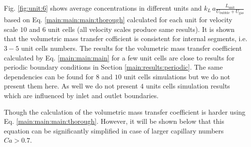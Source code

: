 \documentclass{article}
\newcommand{\feqal}{\end{aligned}\end{equation}}
\newcommand{\vol}{k_L\,a}
\newcommand{\lunit}{L_{\mathrm{unit}}}
\newcommand{\ububble}{U_{\mathrm{bubble}}}
\newcommand{\uliq}{U_{\mathrm{liq}}}
\newcommand{\ugas}{U_{\mathrm{gas}}}
\newcommand{\volnondim}{\vol \frac{\lunit}{\ububble+\ugas}}
\begin{document}
Fig. \ref{fig:unit:6} shows average concentrations in different units and $\volnondim$ based on Eq.
\ref{main:main:main:thorough} calculated for each unit for velocity
scale $10$ and  $6$ unit cells (all velocity scales produce same results). It is shown that the
volumetric mass transfer cofficient is consistent for internal segments, i.e. $3-5$ unit cells numbers.  The results for the volumetric mass transfer coefficient calculated by Eq. \ref{main:main:main} for a few unit cells  are close to results for periodic boundary
conditions in Section \ref{main:results:periodic}. 
The same dependencies
can be found for
$8$ and $10$ unit cells simulations but we do not present them here. As well we do not present $4$
units cells simulation results which are influenced by inlet and outlet boundaries. 

Though the calculation of the  volumetric mass transfer coefficient is harder using Eq. \ref{main:main:main:thorough}. However, it will be shown below that this equation can be significantly simplified in case of larger capillary numbers $Ca>0.7$.
\end{document}

